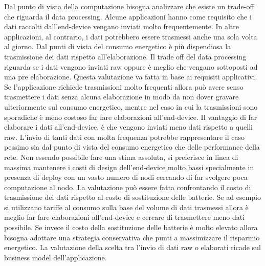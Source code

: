 \documentclass[12pt,a4paper,openright,twoside]{report}
\begin{document}
Dal punto di vista della computazione bisogna analizzare che esiste un trade-off che riguarda il data processing.
Alcune applicazioni hanno come requisito che i dati raccolti dall'end-device vengano inviati molto frequentemente. 
In altre applicazioni, al contrario, i dati potrebbero essere trasmessi anche una sola volta al giorno. 
Dal punti di vista del consumo energetico \`e pi\`u dispendiosa la trasmissione dei dati rispetto all'elaborazione. 
Il trade off del data processing riguarda se i dati vengono inviati raw oppure \`e meglio che vengano sottoposti ad una pre elaborazione. 
Questa valutazione va fatta in base ai requisiti applicativi. Se l'applicazione richiede trasmissioni molto frequenti allora pu\`o avere senso trasmettere i dati senza alcuna elaborazione in modo da non dover gravare ulteriormente sul consumo energetico, mentre nel caso in cui la trasmissioni sono sporadiche \`e meno costoso far fare elaborazioni all'end-device. 
Il vantaggio di far elaborare i dati all'end-device, \`e che vengono inviati meno dati rispetto a quelli raw. L'invio di tanti dati con molta frequenza potrebbe rappresentare il caso pessimo sia dal punto di vista del consumo energetico che delle performance della rete. 
Non essendo possibile fare una stima assoluta, si preferisce in linea di massima mantenere i costi di design dell'end-device molto bassi specialmente in presenza di deploy con un vasto numero di nodi cercando di far svolgere poca computazione al nodo. 
La valutazione pu\`o essere fatta confrontando il costo di trasmissione dei dati rispetto al costo di sostituzione delle batterie. 
Se ad esempio si utilizzano tariffe al consumo sulla base del volume di dati trasmessi allora \`e meglio far fare elaborazioni all'end-device e cercare di trasmettere meno dati possibile. 
Se invece il costo della sostituzione delle batterie \`e molto elevato allora bisogna adottare una strategia conservativa che punti a massimizzare il risparmio energetico. La valutazione della scelta tra l'invio di dati raw o elaborati ricade sul business model dell'applicazione. \cite{K2}
\end{document}
